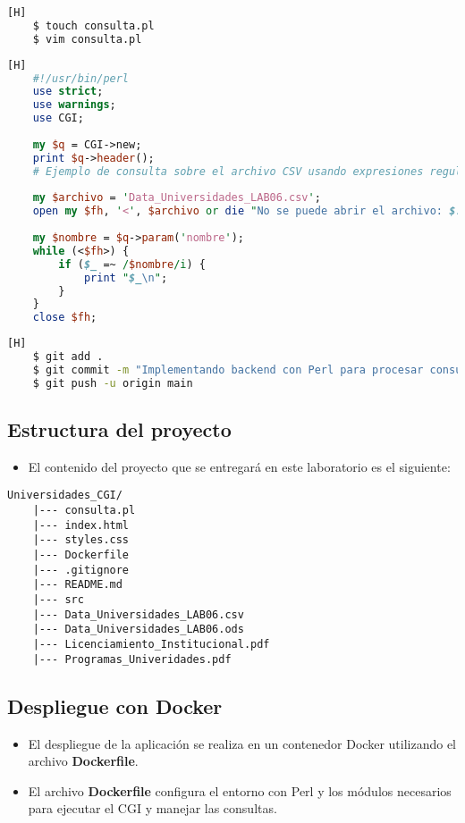 \documentclass{article}
\begin{document}
    \begin{lstlisting}[language=bash,caption={Creando archivo de backend consulta.pl}][H]
    $ touch consulta.pl
    $ vim consulta.pl
    \end{lstlisting}
    
    \begin{lstlisting}[language=perl,caption={Código en Perl para consulta de universidades licenciadas}][H]
    #!/usr/bin/perl
    use strict;
    use warnings;
    use CGI;
    
    my $q = CGI->new;
    print $q->header();
    # Ejemplo de consulta sobre el archivo CSV usando expresiones regulares
    
    my $archivo = 'Data_Universidades_LAB06.csv';
    open my $fh, '<', $archivo or die "No se puede abrir el archivo: $!";
    
    my $nombre = $q->param('nombre');
    while (<$fh>) {
        if ($_ =~ /$nombre/i) {
            print "$_\n";
        }
    }
    close $fh;
    \end{lstlisting}
    
    \begin{lstlisting}[language=bash,caption={Commit: Implementando backend con Perl para procesar consultas}][H]
    $ git add .
    $ git commit -m "Implementando backend con Perl para procesar consultas sobre universidades"
    $ git push -u origin main
    \end{lstlisting}
    
    \subsection{Estructura del proyecto} 
    \begin{itemize} 
        \item El contenido del proyecto que se entregará en este laboratorio es el siguiente:
    \end{itemize}
    
    \begin{lstlisting}[style=ascii-tree]
    Universidades_CGI/
    |--- consulta.pl
    |--- index.html
    |--- styles.css
    |--- Dockerfile
    |--- .gitignore
    |--- README.md
    |--- src
    |--- Data_Universidades_LAB06.csv
    |--- Data_Universidades_LAB06.ods
    |--- Licenciamiento_Institucional.pdf
    |--- Programas_Univeridades.pdf
    \end{lstlisting}
    
    \subsection{Despliegue con Docker}
    \begin{itemize}
        \item El despliegue de la aplicación se realiza en un contenedor Docker utilizando el archivo \textbf{Dockerfile}.
        \item El archivo \textbf{Dockerfile} configura el entorno con Perl y los módulos necesarios para ejecutar el CGI y manejar las consultas.
    \end{itemize}
    
\end{document}
